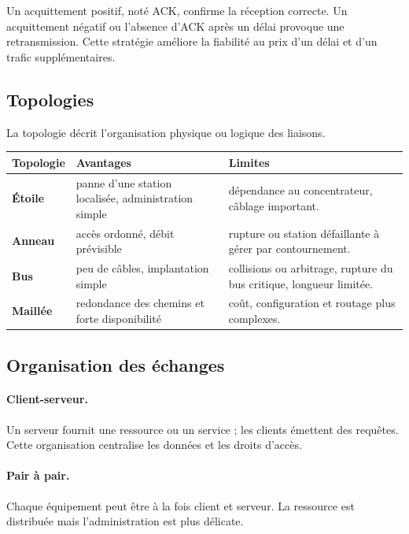 Un acquittement positif, noté ACK, confirme la réception correcte. Un acquittement négatif ou l'absence d'ACK après un délai provoque une retransmission. Cette stratégie améliore la fiabilité au prix d'un délai et d'un trafic supplémentaires.

\subsection{Topologies}

La topologie décrit l'organisation physique ou logique des liaisons.

\begin{center}\TLTopologiesReseau\end{center}

\begin{center}
\small
\begin{tabularx}{\linewidth}{>{\bfseries}p{2cm}X X}
\toprule
Topologie & Avantages & Limites \\
\midrule
Étoile & panne d'une station localisée, administration simple & dépendance au concentrateur, câblage important.\\
Anneau & accès ordonné, débit prévisible & rupture ou station défaillante à gérer par contournement.\\
Bus & peu de câbles, implantation simple & collisions ou arbitrage, rupture du bus critique, longueur limitée.\\
Maillée & redondance des chemins et forte disponibilité & coût, configuration et routage plus complexes.\\
\bottomrule
\end{tabularx}
\end{center}

\subsection{Organisation des échanges}

\paragraph{Client-serveur.}
Un serveur fournit une ressource ou un service ; les clients émettent des requêtes. Cette organisation centralise les données et les droits d'accès.

\paragraph{Pair à pair.}
Chaque équipement peut être à la fois client et serveur. La ressource est distribuée mais l'administration est plus délicate.

